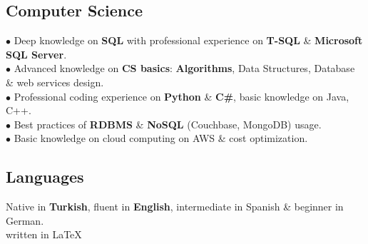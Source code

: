 \documentclass[11pt,twoside,a4paper]{article}
\begin{document}
    \subsection{Computer Science}
      $\bullet$ Deep knowledge on \textbf{SQL} with professional experience on \textbf{T-SQL} \& \textbf{Microsoft SQL Server}.\\
      $\bullet$ Advanced knowledge on \textbf{CS basics}: \textbf{Algorithms}, Data Structures, Database \& web services design.\\
      $\bullet$ Professional coding experience on \textbf{Python} \& \textbf{C\#}, basic knowledge on Java, C++.\\
      $\bullet$ Best practices of \textbf{RDBMS} \& \textbf{NoSQL} (Couchbase, MongoDB) usage.\\
      $\bullet$ Basic knowledge on cloud computing on AWS \& cost optimization.
    \subsection{Languages}
      Native in \textbf{Turkish}, fluent in \textbf{English}, intermediate in Spanish \& beginner in German.\\

    \hfill written in \LaTeX
\end{document}
